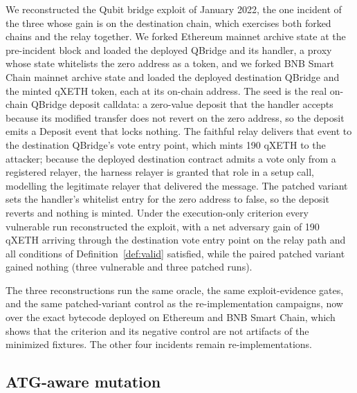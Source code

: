 \documentclass[a4paper]{cas-sc}
\begin{document}
We reconstructed the Qubit bridge exploit of January 2022, the one incident of the three whose gain is on the destination chain, which exercises both forked chains and the relay together. We forked Ethereum mainnet archive state at the pre-incident block and loaded the deployed QBridge and its handler, a proxy whose state whitelists the zero address as a token, and we forked BNB Smart Chain mainnet archive state and loaded the deployed destination QBridge and the minted qXETH token, each at its on-chain address. The seed is the real on-chain QBridge deposit calldata: a zero-value deposit that the handler accepts because its modified transfer does not revert on the zero address, so the deposit emits a Deposit event that locks nothing. The faithful relay delivers that event to the destination QBridge's vote entry point, which mints 190 qXETH to the attacker; because the deployed destination contract admits a vote only from a registered relayer, the harness relayer is granted that role in a setup call, modelling the legitimate relayer that delivered the message. The patched variant sets the handler's whitelist entry for the zero address to false, so the deposit reverts and nothing is minted. Under the execution-only criterion every vulnerable run reconstructed the exploit, with a net adversary gain of 190 qXETH arriving through the destination vote entry point on the relay path and all conditions of Definition~\ref{def:valid} satisfied, while the paired patched variant gained nothing (three vulnerable and three patched runs).

The three reconstructions run the same oracle, the same exploit-evidence gates, and the same patched-variant control as the re-implementation campaigns, now over the exact bytecode deployed on Ethereum and BNB Smart Chain, which shows that the criterion and its negative control are not artifacts of the minimized fixtures. The other four incidents remain re-implementations.

\subsection{ATG-aware mutation}\label{sec:rq-ablation}
\end{document}
